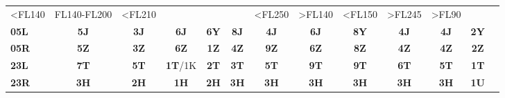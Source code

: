 \documentclass[10pt,landscape,a4paper]{article}
\begin{document}
\begin{textblock}{40}
\begin{table}[]
\begin{tabular}{lcccccccccccc}
\multicolumn{1}{r|}{\scriptsize \textless{}FL140} & 
\multicolumn{1}{r|}{\scriptsize FL140-FL200} & 
\multicolumn{1}{r|}{\scriptsize \textless{}FL210} & 
\multicolumn{1}{r||}{} & 
\multicolumn{1}{r|}{} & 
\multicolumn{1}{r|}{} & 
\multicolumn{1}{r|}{\scriptsize \textless{}FL250} & 
\multicolumn{1}{r|}{\scriptsize \textgreater{}FL140} & 
\multicolumn{1}{r|}{\scriptsize \textless{}FL150} & 
\multicolumn{1}{r|}{\scriptsize \textgreater{}FL245} & 
\multicolumn{1}{l|}{\scriptsize \textgreater{}FL90} & 
\multicolumn{1}{c|}{} \\ \cline{1-12}
\multicolumn{1}{|l|}{\textbf{05L}} & 
\multicolumn{1}{c|}{\textbf{5J}} & 
\multicolumn{1}{c|}{\textbf{3J}} & 
\multicolumn{1}{c|}{\textbf{6J}} & 
\multicolumn{1}{c||}{\textbf{6Y}} & 
\multicolumn{1}{c|}{\textbf{8J}} & 
\multicolumn{1}{c|}{\textbf{4J}} & 
\multicolumn{1}{c|}{\textbf{6J}} & 
\multicolumn{1}{c|}{\textbf{8Y}} & 
\multicolumn{1}{c|}{\textbf{4J}} & 
\multicolumn{1}{c|}{\textbf{4J}} & 
\multicolumn{1}{c|}{\textbf{2Y}} & 
\multicolumn{1}{c|}{} \\ \cline{1-12}
\multicolumn{1}{|l|}{\textbf{05R}} & 
\multicolumn{1}{c|}{\textbf{5Z}} & 
\multicolumn{1}{c|}{\textbf{3Z}} & 
\multicolumn{1}{c|}{\textbf{6Z}} & 
\multicolumn{1}{c||}{\textbf{1Z}} & 
\multicolumn{1}{c|}{\textbf{4Z}} & 
\multicolumn{1}{c|}{\textbf{9Z}} & 
\multicolumn{1}{c|}{\textbf{6Z}} & 
\multicolumn{1}{c|}{\textbf{8Z}} & 
\multicolumn{1}{c|}{\textbf{4Z}} & 
\multicolumn{1}{c|}{\textbf{4Z}} & 
\multicolumn{1}{c|}{\textbf{2Z}} & 
\multicolumn{1}{c|}{} \\ \cline{1-12}
\multicolumn{1}{|l|}{\textbf{23L}} & 
\multicolumn{1}{c|}{\textbf{7T}} & 
\multicolumn{1}{c|}{\textbf{5T}} & 
\multicolumn{1}{c|}{\textbf{1T}/1K} & 
\multicolumn{1}{c||}{\textbf{2T}} & 
\multicolumn{1}{c|}{\textbf{3T}} & 
\multicolumn{1}{c|}{\textbf{5T}} & 
\multicolumn{1}{c|}{\textbf{9T}} & 
\multicolumn{1}{c|}{\textbf{9T}} & 
\multicolumn{1}{c|}{\textbf{6T}} & 
\multicolumn{1}{c|}{\textbf{5T}} & 
\multicolumn{1}{c|}{\textbf{1T}} & 
\multicolumn{1}{c|}{} \\ \cline{1-12}
\multicolumn{1}{|l|}{\textbf{23R}} & 
\multicolumn{1}{c|}{\textbf{3H}} & 
\multicolumn{1}{c|}{\textbf{2H}} & 
\multicolumn{1}{c|}{\textbf{1H}} & 
\multicolumn{1}{c||}{\textbf{2H}} & 
\multicolumn{1}{c|}{\textbf{3H}} & 
\multicolumn{1}{c|}{\textbf{3H}} & 
\multicolumn{1}{c|}{\textbf{3H}} & 
\multicolumn{1}{c|}{\textbf{3H}} & 
\multicolumn{1}{c|}{\textbf{3H}} & 
\multicolumn{1}{c|}{\textbf{3H}} & 
\multicolumn{1}{c|}{\textbf{1U}} & 
\multicolumn{1}{c|}{} \\ \cline{1-12}

\end{tabular}
\end{table}
\end{textblock}
\end{document}
